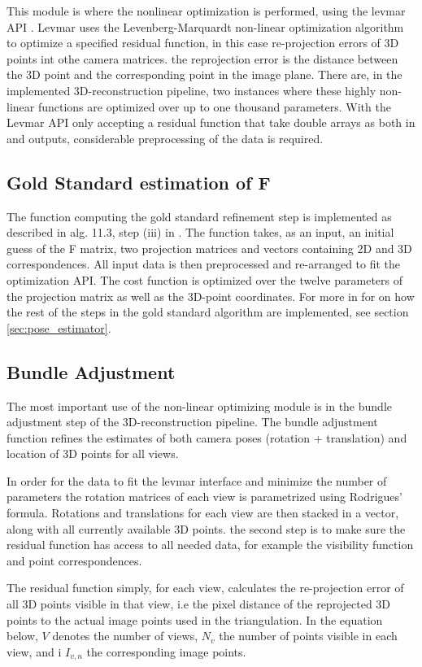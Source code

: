 This module is where the nonlinear optimization is performed, using the levmar API \cite{levmar}. Levmar uses the Levenberg-Marquardt non-linear optimization algorithm to optimize a specified residual function, in this case re-projection errors of 3D points int othe camera matrices. the reprojection error is the distance between the 3D point and the corresponding point in the image plane. There are, in the implemented 3D-reconstruction pipeline, two instances where these highly non-linear functions are optimized over up to one thousand parameters. With the Levmar API only accepting a residual function that take double arrays as both in and outputs, considerable preprocessing of the data is required.

\subsection{Gold Standard estimation of F}
The function computing the gold standard refinement step is implemented as described in alg. 11.3, step (iii) in \cite{HZ}. The function takes, as an input, an initial guess of the F matrix, two projection matrices and vectors containing 2D and 3D correspondences. All input data is then preprocessed and re-arranged to fit the optimization API. The cost function is optimized over the twelve parameters of the projection matrix as well as the 3D-point coordinates. For more in for on how the rest of the steps in the gold standard algorithm are implemented, see section \ref{sec:pose_estimator}.

\subsection{Bundle Adjustment}
The most important use of the non-linear optimizing module is in the bundle adjustment step of the 3D-reconstruction pipeline. The bundle adjustment function refines the estimates of both camera poses (rotation + translation) and location of 3D points for all views. 

In order for the data to fit the levmar interface and minimize the number of parameters the rotation matrices of each view is parametrized  using Rodrigues' formula. Rotations and translations for each view are then stacked in a vector, along with all currently available 3D points. the second step is to make sure the residual function has access to all needed data, for example the visibility function and point correspondences.

The residual function simply, for each view, calculates the re-projection error of all 3D points visible in that view, i.e the pixel distance of the reprojected 3D points to the actual image points used in the triangulation. In the equation below, $V$ denotes the number of views, $N_v$ the number of points visible in each view, and i $I_{v,n}$ the corresponding image points.

